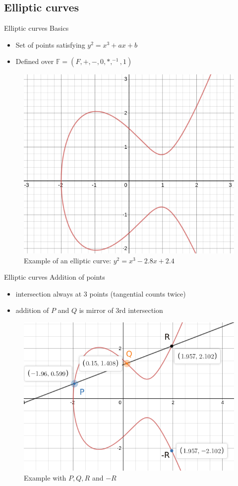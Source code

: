 \documentclass{beamer}
\begin{document}
\subsection{Elliptic curves}
\begin{frame}{Elliptic curves}
	Basics
	\begin{itemize}
		\item Set of points satisfying $y^2 = x^3 + ax + b$
		\item Defined over $\mathbb{F} = (F, +, -, 0, *, ^{-1}, 1)$
	\end{itemize}
	\begin{figure}[hbt!]
		\centering
		\includegraphics[width=0.5\linewidth]{ec1}
		\caption[]{Example of an elliptic curve: $y^2 = x^3 - 2.8x + 2.4$}
		\label{fig:ec-b2}
	\end{figure}
\end{frame}
\begin{frame}{Elliptic curves}
	Addition of points
	\begin{itemize}
		\item intersection always at 3 points (tangential counts twice)
		\item addition of $P$ and $Q$ is mirror of 3rd intersection
	\end{itemize}
	\begin{figure}[hb!]
		\centering
		\includegraphics[width=0.5\linewidth]{ec2}
		\caption[]{Example with $P, Q, R$ and $-R$}
	\end{figure}
\end{frame}
\end{document}
